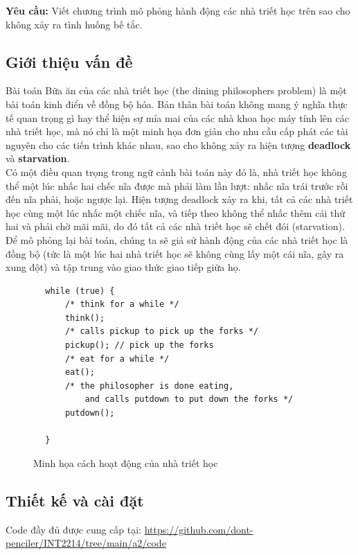 \documentclass{article}
\begin{document}
\textbf{Yêu cầu: }Viết chương trình mô phỏng hành động các nhà triết học trên sao cho không xảy ra tình huống bế tắc.
\subsection{Giới thiệu vấn đề}
Bài toán Bữa ăn của các nhà triết học (the dining philosophers problem) là một bài toán kinh điển về đồng bộ hóa.
Bản thân bài toán không mang ý nghĩa thực tế quan trọng gì hay thể hiện sự mỉa mai của các nhà khoa học máy tính lên các nhà triết học,
mà nó chỉ là một minh họa đơn giản cho nhu cầu cấp phát các tài nguyên cho các tiến trình khác nhau, sao cho không xảy ra
hiện tượng \textbf{deadlock} và \textbf{starvation}. \\

Có một điều quan trọng trong ngữ cảnh bài toán này đó là, nhà triết học không thể một lúc nhấc hai chếc nĩa được mà phải làm lần lượt:
nhấc nĩa trái trước rồi đến nĩa phải, hoặc ngược lại. Hiện tượng deadlock xảy ra khi, tất cả các nhà triết học cùng một lúc nhấc một chiếc nĩa,
và tiếp theo không thể nhấc thêm cái thứ hai và phải chờ mãi mãi, do đó tất cả các nhà triết học sẽ chết đói (starvation). Để mô phỏng
lại bài toán, chúng ta sẽ giả sử  hành động của các nhà triết học là đồng bộ (tức là một lúc hai nhà triết học sẽ không cùng lấy một cái nĩa,
gây ra xung đột) và tập trung vào giao thức giao tiếp giữa họ. \\


\begin{shaded}

    \begin{lstlisting}
        while (true) {
            /* think for a while */
            think();
            /* calls pickup to pick up the forks */
            pickup(); // pick up the forks
            /* eat for a while */
            eat();
            /* the philosopher is done eating, 
                and calls putdown to put down the forks */
            putdown();

        }
    \end{lstlisting}
\end{shaded}

\begin{figure}[h]
    \centering
    \caption{Minh họa cách hoạt động của nhà triết học}
\end{figure}

\subsection{Thiết kế và cài đặt}
Code đầy đủ được cung cấp tại:  \url{https://github.com/dont-penciler/INT2214/tree/main/a2/code} \\
\end{document}
